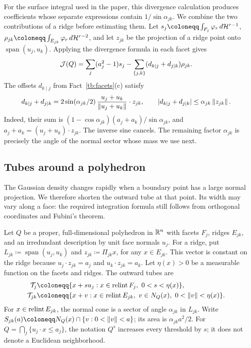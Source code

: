 For the surface integral used in the paper, this divergence
calculation produces coefficients whose separate expressions contain
\(1/\sin\alpha_{jk}\). We combine the two contributions of a ridge
before estimating them. Let
\(s_j\coloneqq \int_{F_j}\varphi_r\,d\Haus^{r-1}\),
\(\rho_{jk}\coloneqq \int_{E_{jk}}\varphi_r\,d\Haus^{r-2}\), and let
\(z_{jk}\) be the projection of a ridge point onto
\(\operatorname{span}(u_j,u_k)\). Applying the divergence formula in
each facet gives
\[
 \mathcal J(Q)=\sum_j(a_j^2-1)s_j
       -\sum_{\{j,k\}}(d_{k\mid j}+d_{j\mid k})\rho_{jk}.
\]
The offsets \(d_{k\mid j}\) from Fact~\ref{tb:facets}(c) satisfy
\[
 d_{k\mid j}+d_{j\mid k}
 =2\sin(\alpha_{jk}/2)\,
       \frac{u_j+u_k}{\left\lVert u_j+u_k\right\rVert}\cdot z_{jk},\qquad
 |d_{k\mid j}+d_{j\mid k}|\le\alpha_{jk}\left\lVert z_{jk}\right\rVert.
\]
Indeed, their sum is
\((1-\cos\alpha_{jk})(a_j+a_k)/\sin\alpha_{jk}\), and
\(a_j+a_k=(u_j+u_k)\cdot z_{jk}\).
The inverse sine cancels. The remaining factor \(\alpha_{jk}\)
is precisely the angle of the normal sector whose mass we use next.

\subsection{Tubes around a polyhedron}\label{tb:sec:tubes}

The Gaussian density changes rapidly when a boundary point has a large
normal projection. We therefore shorten the outward tube at that point.
Its width may vary along a face: the required integration formula still
follows from orthogonal coordinates and Fubini's theorem.

Let \(Q\) be a proper, full-dimensional polyhedron in \(\mathbb R^n\) with
facets \(F_j\), ridges \(E_{jk}\), and an irredundant description by
unit face normals \(u_j\). For a ridge, put
\(L_{jk}\coloneqq \operatorname{span}(u_j,u_k)\) and
\(z_{jk}\coloneqq \Pi_{jk}x\), for any \(x\in E_{jk}\). This vector is constant
on the ridge because
\(u_j\cdot z_{jk}=a_j\) and \(u_k\cdot z_{jk}=a_k\).
Let \(\eta(x)>0\) be a measurable function on the facets and ridges.
The outward tubes are
\begin{align*}
 \mathcal T_j&\coloneqq \{x+s u_j:x\in\relint F_j,\ 0<s<\eta(x)\},\\
 \mathcal T_{jk}&\coloneqq \{x+v:x\in\relint E_{jk},\ v\in N_Q(x),\
                         0<\norm v<\eta(x)\}.
\end{align*}
For \(x\in\operatorname{relint} E_{jk}\), the normal cone is a sector of angle
\(\alpha_{jk}\) in \(L_{jk}\). Write
\(S_{jk}(a)\coloneqq N_Q(x)\cap\{v:0<\norm v<a\}\); its area is
\(\alpha_{jk}a^2/2\). For \(Q=\bigcap_j\{u_j\cdot x\le a_j\}\),
the notation \(Q^s\) increases every threshold by \(s\); it does not
denote a Euclidean neighborhood.


